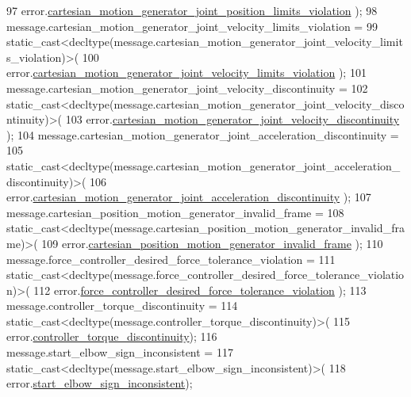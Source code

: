 \begin{DoxyCode}
97           error.\hyperlink{structfranka_1_1Errors_a73aef7473fd6d1d5b207e68fa35948c5}{cartesian\_motion\_generator\_joint\_position\_limits\_violation}
      );
98   message.cartesian\_motion\_generator\_joint\_velocity\_limits\_violation =
99       \textcolor{keyword}{static\_cast<}decltype(message.cartesian\_motion\_generator\_joint\_velocity\_limits\_violation)\textcolor{keyword}{>}(
100           error.\hyperlink{structfranka_1_1Errors_a435d16d62a123bfbf578bc76e3780605}{cartesian\_motion\_generator\_joint\_velocity\_limits\_violation}
      );
101   message.cartesian\_motion\_generator\_joint\_velocity\_discontinuity =
102       \textcolor{keyword}{static\_cast<}decltype(message.cartesian\_motion\_generator\_joint\_velocity\_discontinuity)\textcolor{keyword}{>}(
103           error.\hyperlink{structfranka_1_1Errors_a1c8c56766fefc19fda5d5de909ca5b37}{cartesian\_motion\_generator\_joint\_velocity\_discontinuity}
      );
104   message.cartesian\_motion\_generator\_joint\_acceleration\_discontinuity =
105       \textcolor{keyword}{static\_cast<}decltype(message.cartesian\_motion\_generator\_joint\_acceleration\_discontinuity)\textcolor{keyword}{>}(
106           error.\hyperlink{structfranka_1_1Errors_a2e223ef3c771709a6a3f094adf12f9cb}{cartesian\_motion\_generator\_joint\_acceleration\_discontinuity}
      );
107   message.cartesian\_position\_motion\_generator\_invalid\_frame =
108       \textcolor{keyword}{static\_cast<}decltype(message.cartesian\_position\_motion\_generator\_invalid\_frame)\textcolor{keyword}{>}(
109           error.\hyperlink{structfranka_1_1Errors_aa1952c6da2f81578861a19b947c97b85}{cartesian\_position\_motion\_generator\_invalid\_frame}
      );
110   message.force\_controller\_desired\_force\_tolerance\_violation =
111       \textcolor{keyword}{static\_cast<}decltype(message.force\_controller\_desired\_force\_tolerance\_violation)\textcolor{keyword}{>}(
112           error.\hyperlink{structfranka_1_1Errors_ae474f20a64b2585dbe6496966dddff0a}{force\_controller\_desired\_force\_tolerance\_violation}
      );
113   message.controller\_torque\_discontinuity =
114       \textcolor{keyword}{static\_cast<}decltype(message.controller\_torque\_discontinuity)\textcolor{keyword}{>}(
115           error.\hyperlink{structfranka_1_1Errors_af40d93759ace9ee6026208110692a732}{controller\_torque\_discontinuity});
116   message.start\_elbow\_sign\_inconsistent =
117       \textcolor{keyword}{static\_cast<}decltype(message.start\_elbow\_sign\_inconsistent)\textcolor{keyword}{>}(
118           error.\hyperlink{structfranka_1_1Errors_aa6de1956ac056792a1dea6b9ddd52a50}{start\_elbow\_sign\_inconsistent});

\end{DoxyCode}
